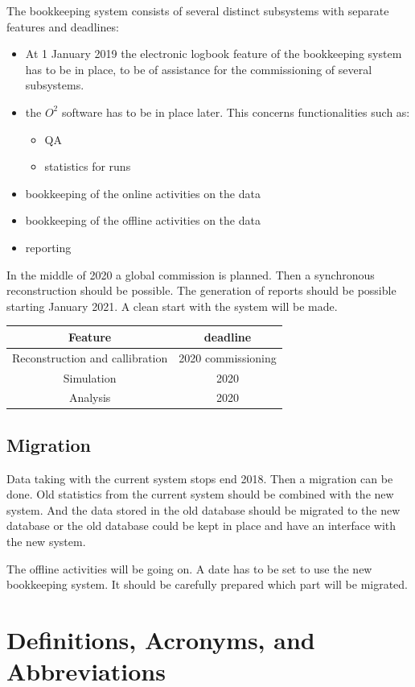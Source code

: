 The bookkeeping system consists of several distinct subsystems with separate features and deadlines:
\begin{itemize}
  \item At 1 January 2019 the electronic logbook feature of the bookkeeping system has to be in place, to be of assistance for the commissioning of several subsystems. 
  \item the $O^2$ software has to be in place later. This concerns functionalities such as:
  \begin{itemize}
    \item QA
    \item statistics for runs
  \end{itemize}
  \item bookkeeping of the online activities on the data
  \item bookkeeping of the offline activities on the data
  \item reporting
\end{itemize}
In the middle of 2020 a global commission is planned. Then a synchronous reconstruction should be possible. The generation of reports should be possible starting January 2021. A clean start with the system will be made.

\begin{tabular}{cc}
\hline
Feature & deadline\\
\hline
\hline
 Reconstruction and callibration  & 2020 commissioning \\
 \hline
Simulation   & 2020\\
\hline
Analysis & 2020\\
\hline
\end{tabular}

\subsection{Migration}
Data taking with the current system stops end 2018. Then a migration can be done. Old statistics from the current system should be combined with the new system. And the data stored in the old database should be migrated to the new database or the old database could be kept in place and have an interface with the new system. 

The offline activities will be going on. A date has to be set to use the new bookkeeping system. It should be carefully prepared which part will be migrated.

\section{Definitions, Acronyms, and Abbreviations}

